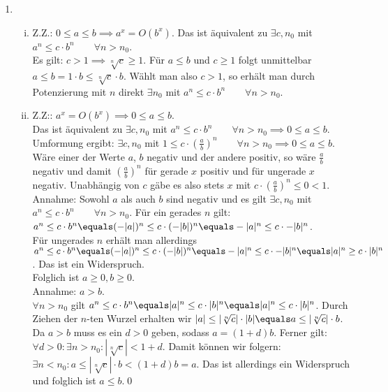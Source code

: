 \documentclass{article}
\begin{document}
\begin{enumerate}[a)]
\begin{enumerate}[1.]
		\item 
		\begin{enumerate}[i)]
			\item Z.Z.: $0\leq a\leq b \implies a^x = O(b^x)$.
			Das ist äquivalent zu $\exists c, n_0$ mit $a^n \leq c\cdot b^n \quad \quad \forall n> n_0$.\\
			Es gilt: $c> 1 \implies \sqrt[n]{c} \geq 1$. Für $a\leq b$ und $c\geq 1$ folgt unmittelbar $a \leq b = 1\cdot b \leq  \sqrt[n]{c} \cdot b$. Wählt man also $c> 1$, so erhält man durch Potenzierung mit $n$ direkt $\exists n_0$ mit $a^n\leq c\cdot b^n \quad \quad \forall n> n_0$.
			\item Z.Z:: $a^x = O(b^x) \implies 0\leq a\leq b$.\\
			Das ist äquivalent zu $\exists c, n_0$ mit $a^n \leq c\cdot b^n \quad \quad \forall n> n_0 \implies 0 \leq a\leq b$.
			Umformung ergibt: $\exists c, n_0$ mit $1 \leq c\cdot \left(\frac{a}{b}\right)^n \quad \quad \forall n> n_0 \implies 0 \leq a\leq b$.
			Wäre einer der Werte $a$, $b$ negativ und der andere positiv, so wäre $\frac{a}{b}$ negativ und damit $\left(\frac{a}{b}\right)^n$ für gerade $x$ positiv und für ungerade $x$ negativ. Unabhängig von $c$ gäbe es also stets $x$ mit $ c\cdot \left(\frac{a}{b}\right)^n \leq 0 < 1$.\\
			Annahme: Sowohl $a$ als auch $b$ sind negativ und es gilt $\exists c, n_0$ mit $a^n \leq c\cdot b^n \quad \quad \forall n> n_0$. Für ein gerades $n$ gilt: $a^n \leq c\cdot b^n \equals (-|a|)^n \leq c\cdot (-|b|)^n \equals - |a|^n \leq c\cdot -|b|^n$.\\
			Für ungerades $n$ erhält man allerdings $a^n \leq c\cdot b^n \equals (-|a|)^n \leq c\cdot (-|b|)^n \equals - |a|^n \leq c\cdot -|b|^n\equals |a|^n \geq c \cdot |b|^n$. Das ist ein Widerspruch.\\
			Folglich ist $a\geq 0, b\geq 0$.\\
			Annahme: $a > b$.\\
			$\forall n> n_0$ gilt $a^n \leq c\cdot b^n \equals |a|^n \leq c\cdot |b|^n \equals |a|^n \leq c\cdot |b|^n$.
			Durch Ziehen der $n$-ten Wurzel erhalten wir $|a| \leq |\sqrt[n]{c}| \cdot |b| \equals a\leq |\sqrt[n]{c}| \cdot b$.
			Da $a> b$ muss es ein $d>0$ geben, sodass $a = (1+d) b$.
			Ferner gilt: $\forall d > 0: \exists n > n_0: |\sqrt[n]{c}| < 1 + d$.
			Damit können wir folgern: $\exists n < n_0: a\leq |\sqrt[n]{c}| \cdot b <  (1 + d)b = a$. Das ist allerdings ein Widerspruch und folglich ist $a\leq b$.\qed
		\end{enumerate}
	\end{enumerate}
\end{enumerate}
\end{document}
